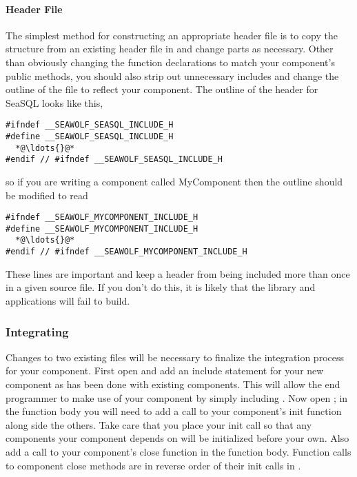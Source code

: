 \paragraph{Header File}
The simplest method for constructing an appropriate header file is to copy the
structure from an existing \libseawolf{} header file in
 and change parts as
necessary. Other than obviously changing the function declarations to match your
component's public methods, you should also strip out unnecessary includes and
change the outline of the file to reflect your component. The outline of the
header for SeaSQL looks like this,
\begin{lstlisting}[language=Cextended, caption=seasql.h outline, escapeinside={{*@}{@*}}]
#ifndef __SEAWOLF_SEASQL_INCLUDE_H
#define __SEAWOLF_SEASQL_INCLUDE_H
  *@\ldots{}@*
#endif // #ifndef __SEAWOLF_SEASQL_INCLUDE_H
\end{lstlisting}
so if you are writing a component called MyComponent then the outline should be modified to read 
\begin{lstlisting}[language=Cextended, caption=mycomponent.h outline, escapeinside={{*@}{@*}}]
#ifndef __SEAWOLF_MYCOMPONENT_INCLUDE_H
#define __SEAWOLF_MYCOMPONENT_INCLUDE_H
  *@\ldots{}@*
#endif // #ifndef __SEAWOLF_MYCOMPONENT_INCLUDE_H
\end{lstlisting}
These lines are important and keep a header from being included more than once
in a given source file. If you don't do this, it is likely that the library and
applications will fail to build.

\subsubsection{Integrating}
Changes to two existing files will be necessary to finalize the integration
process for your component. First open  and add an
include statement for your new component as has been done with existing
components. This will allow the end programmer to make use of your component by
simply including . Now open ; in the
 function body you will need to
add a call to your component's init function along side the others. Take care
that you place your init call so that any components your component depends on
will be initialized before your own. Also add a call to your component's close
function in the  function
body. Function calls to component close methods are in reverse order of their
init calls in .

